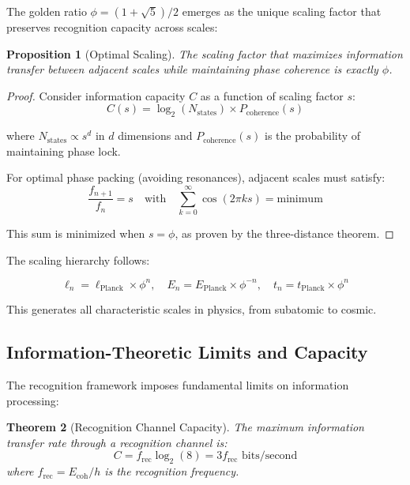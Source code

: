 \documentclass[12pt,a4paper]{article}
\newtheorem{theorem}{Theorem}
\newtheorem{proposition}[theorem]{Proposition}
\begin{document}
The golden ratio $\phi = (1+\sqrt{5})/2$ emerges as the unique scaling factor that preserves recognition capacity across scales:

\begin{proposition}[Optimal Scaling]
The scaling factor that maximizes information transfer between adjacent scales while maintaining phase coherence is exactly $\phi$.
\end{proposition}

\begin{proof}
Consider information capacity $C$ as a function of scaling factor $s$:
\begin{equation}
C(s) = \log_2(N_{\text{states}}) \times P_{\text{coherence}}(s)
\end{equation}

where $N_{\text{states}} \propto s^d$ in $d$ dimensions and $P_{\text{coherence}}(s)$ is the probability of maintaining phase lock.

For optimal phase packing (avoiding resonances), adjacent scales must satisfy:
\begin{equation}
\frac{f_{n+1}}{f_n} = s \quad \text{with} \quad \sum_{k=0}^{\infty} \cos(2\pi k s) = \text{minimum}
\end{equation}

This sum is minimized when $s = \phi$, as proven by the three-distance theorem.
\end{proof}

The scaling hierarchy follows:

\begin{equation}
\ell_n = \ell_{\text{Planck}} \times \phi^n, \quad E_n = E_{\text{Planck}} \times \phi^{-n}, \quad t_n = t_{\text{Planck}} \times \phi^n
\end{equation}

This generates all characteristic scales in physics, from subatomic to cosmic.

\subsection{Information-Theoretic Limits and Capacity}

The recognition framework imposes fundamental limits on information processing:

\begin{theorem}[Recognition Channel Capacity]
The maximum information transfer rate through a recognition channel is:
\begin{equation}
C = f_{\text{rec}} \log_2(8) = 3f_{\text{rec}} \text{ bits/second}
\end{equation}
where $f_{\text{rec}} = E_{\text{coh}}/h$ is the recognition frequency.
\end{theorem}
\end{document}
